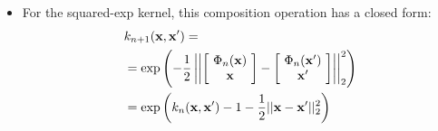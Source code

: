 \documentclass[portrait,a0b,final,a4resizeable]{include/a0poster}
\begin{document}
\begin{poster}
\begin{multicols}{2}
\begin{minipage}[c]{0.5\columnwidth}
\begin{itemize}
\item For the squared-exp kernel, this composition operation has a closed form:%
%
%
%
%
%
\begin{align*}
& k_{n+1}(\mathbf{x}, \mathbf{x}') = \nonumber \\
& = \exp \left( -\frac{1}{2} \left|\left| \left[ \! \begin{array}{c} \Phi_n(\mathbf{x}) \\ \mathbf{x} \end{array} \! \right]  - \left[ \! \begin{array}{c} \Phi_n(\mathbf{x}') \\ \mathbf{x}' \end{array} \! \right] \right| \right|_2^2 \right) \nonumber \\
& = \exp \left( k_n(\mathbf{x}, \mathbf{x}') - 1 -\frac{1}{2} || \mathbf{x} - \mathbf{x}' ||_2^2 \right)
\end{align*}


\end{itemize}
\end{minipage}
\end{multicols}
\end{poster}
\end{document}
